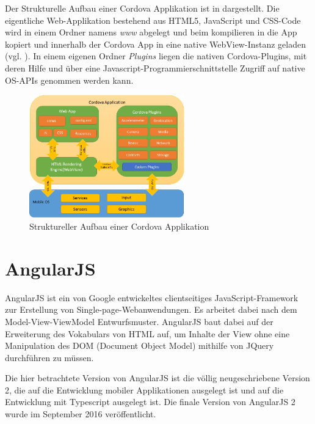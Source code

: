 Der Strukturelle Aufbau einer Cordova Applikation ist in  dargestellt.
Die eigentliche Web-Applikation bestehend aus HTML5, JavaScript und CSS-Code wird in einem Ordner namens \emph{www} abgelegt und beim kompilieren in die App kopiert und innerhalb der Cordova App in eine native WebView-Instanz geladen (vgl. ). In einem eigenen Ordner \emph{Plugins} liegen die nativen Cordova-Plugins, mit deren Hilfe und über eine Javascript-Programmierschnittstelle Zugriff auf native OS-APIs genommen werden kann.
%
\begin{figure}[htb] 
	\centering
	\includegraphics[width=0.6\textwidth]{data/bilder/cordovaapparchitecture.png}
	\caption{Struktureller Aufbau einer Cordova Applikation \cite{cordovaApplicationArchitecture}}
	\label{fig:Cordovaapparchitecture}
\end{figure}
%
%
\section{AngularJS}
\label{sec:AngularJS}
%
AngularJS ist ein von Google entwickeltes clientseitiges JavaScript-Framework zur Erstellung von Single-page-Webanwendungen. Es arbeitet dabei nach dem Model-View-ViewModel Entwurfsmuster. AngularJS baut dabei auf der Erweiterung des Vokabulars von HTML auf, um Inhalte der View ohne eine Manipulation des DOM (Document Object Model) mithilfe von JQuery durchführen zu müssen.

Die hier betrachtete Version von AngularJS ist die völlig neugeschriebene Version 2, die auf die Entwicklung mobiler Applikationen ausgelegt ist und auf die Entwicklung mit Typescript ausgelegt ist. Die finale Version von AngularJS 2 wurde im September 2016 veröffentlicht.
%
